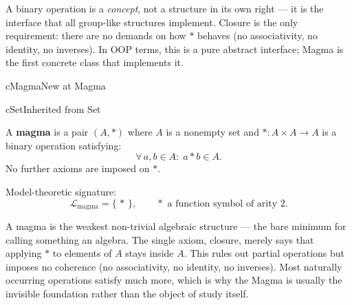 \begin{remark}
  A binary operation is a \emph{concept}, not a structure in its own right —
  it is the interface that all group-like structures implement.  Closure is the
  only requirement: there are no demands on how $*$ behaves (no associativity,
  no identity, no inverses).  In OOP terms, this is a pure abstract interface;
  Magma is the first concrete class that implements it.
\end{remark}



\clearpage\thispagestyle{plain}

\begin{bpnew}{cMagma}{New at Magma}
\end{bpnew}

\begin{bpinh}{cSet}{Inherited from Set}
\end{bpinh}

\begin{definition}[Magma]
  A \textbf{magma} is a pair $(A, *)$ where $A$ is a nonempty set and
  $* : A \times A \to A$ is a binary operation satisfying:
  \[
    \forall\,a, b \in A:\; a * b \in A. \tag{Closure}
  \]
  No further axioms are imposed on $*$.

  \medskip\noindent
  Model-theoretic signature:
  \[
    \mathcal{L}_{\mathrm{magma}} = \{\,*\,\},
    \qquad * \text{ a function symbol of arity } 2.
  \]
\end{definition}

\begin{remark}
  A magma is the weakest non-trivial algebraic structure — the bare minimum
  for calling something an algebra.  The single axiom, closure, merely says
  that applying $*$ to elements of $A$ stays inside $A$.  This rules out
  partial operations but imposes no coherence (no associativity, no identity,
  no inverses).  Most naturally occurring operations satisfy much more, which
  is why the Magma is usually the invisible foundation rather than the object
  of study itself.
\end{remark}

